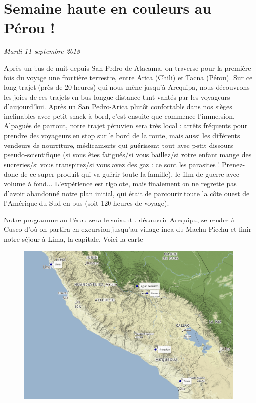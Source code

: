 \hypertarget{semaine-haute-en-couleurs-au-puxe9rou}{%
\section{Semaine haute en couleurs au Pérou
!}\label{semaine-haute-en-couleurs-au-puxe9rou}}

\emph{Mardi 11 septembre 2018}

Après un bus de nuit depuis San Pedro de Atacama, on traverse pour la
première fois du voyage une frontière terrestre, entre Arica (Chili) et
Tacna (Pérou). Sur ce long trajet (près de 20 heures) qui nous mène
jusqu'à Arequipa, nous découvrons les joies de ces trajets en bus longue
distance tant vantés par les voyageurs d'aujourd'hui. Après un San
Pedro-Arica plutôt confortable dans nos sièges inclinables avec petit
snack à bord, c'est ensuite que commence l'immersion. Alpagués de
partout, notre trajet péruvien sera très local : arrêts fréquents pour
prendre des voyageurs en stop sur le bord de la route, mais aussi les
différents vendeurs de nourriture, médicaments qui guérissent tout avec
petit discours pseudo-scientifique (si vous êtes fatigués/si vous
baillez/si votre enfant mange des sucreries/si vous transpirez/si vous
avez des gaz : ce sont les parasites ! Prenez-donc de ce super produit
qui va guérir toute la famille), le film de guerre avec volume à fond...
L'expérience est rigolote, mais finalement on ne regrette pas d'avoir
abandonné notre plan initial, qui était de parcourir toute la côte ouest
de l'Amérique du Sud en bus (soit 120 heures de voyage).

Notre programme au Pérou sera le suivant : découvrir Arequipa, se rendre
à Cusco d'où on partira en excursion jusqu'au village inca du Machu
Picchu et finir notre séjour à Lima, la capitale. Voici la carte :

\begin{figure}
\centering
\includegraphics{maps/Peru.png}
\end{figure}

